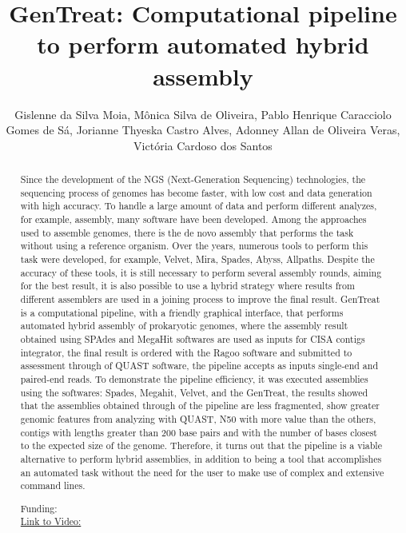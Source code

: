 \documentclass[twoside]{article}
\title{\vspace{-15mm}\fontsize{24pt}{10pt}\selectfont\textbf{ GenTreat: Computational pipeline to perform automated hybrid assembly }} %
\author{ Gislenne da Silva Moia,  M\^onica Silva de Oliveira,  Pablo Henrique Caracciolo Gomes de S\'a,  Jorianne Thyeska Castro Alves,  Adonney Allan de Oliveira Veras,  Vict\'oria Cardoso dos Santos }
\affil{ UNIVERSIDADE FEDERAL DO PAR\'A,  UNIVERSIDADE FEDERAL DO PAR\'A }
\date{}
\begin{document}
  
  
  \maketitle %
  
  
  \thispagestyle{fancy} %
  
  
  \begin{abstract}
  Since the development of the NGS (Next-Generation Sequencing) technologies,  the sequencing process of genomes has become faster,  with low cost and data generation with high accuracy. To handle a large amount of data and perform different analyzes,  for example,  assembly,  many software have been developed. Among the approaches used to assemble genomes,  there is the de novo assembly that performs the task without using a reference organism. Over the years,  numerous tools to perform this task were developed,  for example,  Velvet,  Mira,  Spades,  Abyss,  Allpaths. Despite the accuracy of these tools,  it is still necessary to perform several assembly rounds,  aiming for the best result,  it is also possible to use a hybrid strategy where results from different assemblers are used in a joining process to improve the final result. GenTreat is a computational pipeline,  with a friendly graphical interface,  that performs automated hybrid assembly of prokaryotic genomes,  where the assembly result obtained using SPAdes and MegaHit softwares are used as inputs for CISA contigs integrator,  the final result is ordered with the Ragoo software and submitted to assessment through of QUAST software,  the pipeline accepts as inputs single-end and paired-end reads. To demonstrate the pipeline efficiency,  it was executed assemblies using the softwares: Spades,  Megahit,  Velvet,  and the GenTreat,  the results showed that the assemblies obtained through of the pipeline are less fragmented,  show greater genomic features from analyzing with QUAST,  N50 with more value than the others,  contigs with lengths greater than 200 base pairs and with the number of bases closest to the expected size of the genome. Therefore,  it turns out that the pipeline is a viable alternative to perform hybrid assemblies,  in addition to being a tool that accomplishes an automated task without the need for the user to make use of complex and extensive command lines.
  
  Funding:   \\
  \href{http://ab3c.org.br/xpress_pres2020/xmxp2020-296609.html}{Link to Video:}

  \end{abstract}
   
  
\end{document}
